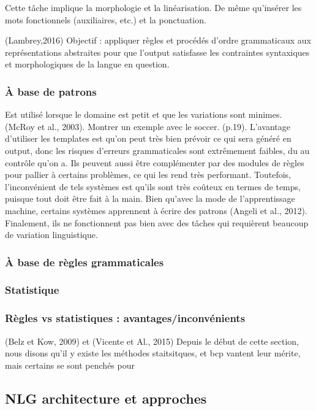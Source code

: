 Cette tâche implique la morphologie et la linéarisation. De même qu'insérer les mots fonctionnels (auxiliaires, etc.) et la ponctuation.

(Lambrey,2016) Objectif : appliquer règles et procédés d'ordre grammaticaux aux représentations abstraites pour que l'output satisfasse les contraintes syntaxiques et morphologiques de la langue en question.

\subsubsection{À base de patrons}
Est utilisé lorsque le domaine est petit et que les variations sont minimes. (McRoy et al., 2003). Montrer un exemple avec le soccer. (p.19).  L'avantage d'utiliser les templates est qu'on peut très bien prévoir ce qui sera généré en output, donc les risques d'erreurs grammaticales sont extrêmement faibles, du au contrôle qu'on a. Ils peuvent aussi être complémenter par des modules de règles pour pallier à certains problèmes, ce qui les rend très performant. Toutefois, l'inconvénient de tels systèmes est qu'ils sont très coûteux en termes de temps, puisque tout doit être fait à la main. Bien qu'avec la mode de l'apprentissage machine, certains systèmes apprennent à écrire des patrons (Angeli et al., 2012). Finalement, ils ne fonctionnent pas bien avec des tâches qui requièrent beaucoup de variation linguistique.

\subsubsection{À base de règles grammaticales}


\subsubsection{Statistique}

\subsubsection{Règles vs statistiques : avantages/inconvénients}
(Belz et Kow, 2009) et (Vicente et Al., 2015)
Depuis le début de cette section, nous disons qu'il y existe les méthodes staitsitques, et bcp vantent leur mérite, mais certains se sont penchés pour 

\subsection{NLG architecture et approches}

